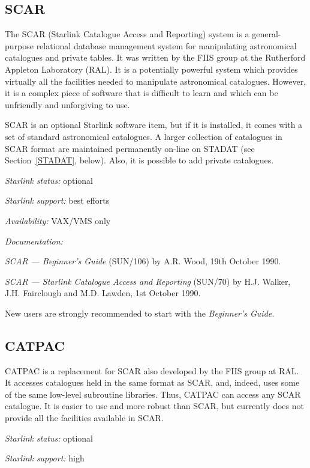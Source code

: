 \documentclass[twoside,11pt,nolof]{starlink}
\begin{document}
\subsection{SCAR}

The SCAR (Starlink Catalogue Access and Reporting) system is a
general-purpose relational database management system for manipulating
astronomical catalogues and private tables. It was written by the FIIS
group at the Rutherford Appleton Laboratory (RAL). It is a potentially
powerful system which provides virtually all the facilities needed to
manipulate astronomical catalogues. However, it is a complex piece of
software that is difficult to learn and which can be unfriendly and
unforgiving to use.

SCAR is an optional Starlink software item, but if it is installed, it
comes with a set of standard astronomical catalogues. A larger
collection of catalogues in SCAR format are maintained permanently
on-line on STADAT (see Section~\ref{STADAT}, below). Also, it is
possible to add private catalogues.

\textit{Starlink status:} optional

\textit{Starlink support:} best efforts

\textit{Availability:} VAX/VMS only

\textit{Documentation:}

\textit{SCAR --- Beginner's Guide}
(SUN/106) by A.R. Wood, 19th October
1990.

\textit{SCAR --- Starlink Catalogue Access and Reporting}
(SUN/70) by
H.J. Walker, J.H. Fairclough and M.D. Lawden, 1st October 1990.

New users are strongly recommended to start with the \textit{Beginner's
Guide.}

\subsection{CATPAC}

CATPAC is a replacement for SCAR also developed by the FIIS group at
RAL. It accesses catalogues held in the same format as SCAR, and,
indeed, uses some of the same low-level subroutine libraries. Thus,
CATPAC can access any SCAR catalogue. It is easier to use and more
robust than SCAR, but currently does not provide all the facilities
available in SCAR.

\textit{Starlink status:} optional

\textit{Starlink support:} high
\end{document}
